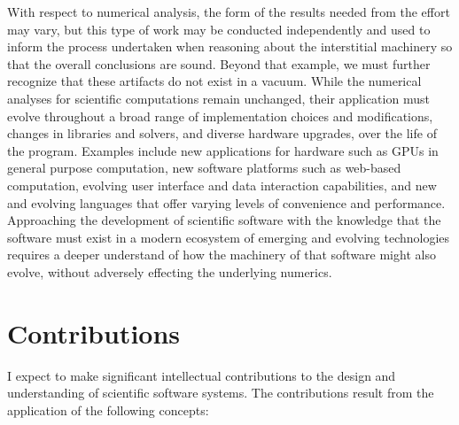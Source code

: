 \documentclass[12pt]{article}
\begin{document}
With respect to numerical analysis, the form of the results needed
from the effort may vary, but this type of work may be conducted
independently and used to inform the process undertaken when reasoning
about the interstitial machinery so that the overall conclusions are
sound.  Beyond that example, we must further recognize that these artifacts do not exist in a vacuum.  While the numerical analyses for scientific computations remain unchanged, their application must evolve throughout a broad range of implementation choices and modifications, changes in libraries and solvers, and diverse hardware upgrades, over the life of the program.
Examples include new applications for hardware such as GPUs in general purpose computation, new software platforms such as web-based computation, evolving user interface and data interaction capabilities, and new and evolving languages that offer varying levels of convenience and performance.  Approaching the development of scientific software with the knowledge that the software must exist in a modern ecosystem of emerging and evolving technologies requires a deeper understand of how the machinery of that software might also evolve, without adversely effecting the underlying numerics.

\section{Contributions}

I expect to make significant intellectual contributions to the design and understanding of scientific software systems.  The contributions result from the application of the following concepts:
\end{document}
